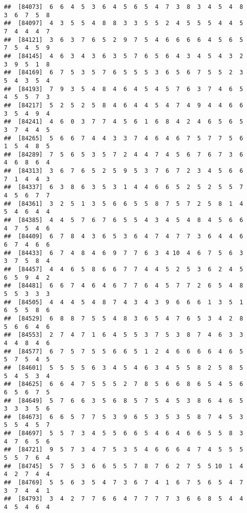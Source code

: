 \documentclass[
]{book}
\begin{document}
\begin{verbatim}
##  [84073]  6  6  4  5  3  6  4  5  6  5  4  7  3  8  3  4  5  4  8  3  6  7  5  8
##  [84097]  4  3  5  5  4  8  8  3  3  5  5  2  4  5  5  5  4  4  5  7  4  4  4  7
##  [84121]  3  6  3  7  6  5  2  9  7  5  4  6  6  6  6  4  5  6  5  7  5  4  5  9
##  [84145]  4  6  3  4  3  6  3  5  7  6  5  6  4  3  4  5  4  3  2  3  9  5  1  8
##  [84169]  6  7  5  3  5  7  6  5  5  5  3  6  5  6  7  5  5  2  3  5  4  3  5  4
##  [84193]  7  9  3  5  4  8  4  6  4  5  4  5  7  6  3  7  4  6  5  4  5  5  7  3
##  [84217]  5  2  5  2  5  8  4  6  4  4  5  4  7  4  9  4  4  6  6  3  5  4  9  4
##  [84241]  4  6  0  3  7  7  4  5  6  1  6  8  4  2  4  6  5  6  5  3  7  4  4  5
##  [84265]  5  6  6  7  4  4  3  3  7  4  6  4  6  7  5  7  7  5  6  1  5  4  8  5
##  [84289]  7  5  6  5  3  5  7  2  4  4  7  4  5  6  7  6  7  3  6  4  6  8  6  4
##  [84313]  3  6  7  6  5  2  5  9  5  3  7  6  7  2  3  4  5  6  6  7  1  4  4  3
##  [84337]  6  3  8  6  3  5  3  1  4  4  6  6  5  2  5  2  5  5  7  4  5  6  7  7
##  [84361]  3  2  5  1  3  5  6  6  5  5  8  7  5  7  2  5  8  1  4  5  4  6  4  4
##  [84385]  4  4  5  7  6  7  6  5  5  4  3  4  5  4  8  4  5  6  6  4  7  5  4  6
##  [84409]  6  7  8  4  3  6  5  3  6  4  7  4  7  7  3  6  4  4  6  6  7  4  6  6
##  [84433]  6  7  4  8  4  6  9  7  7  6  3  4 10  4  6  7  5  6  3  3  7  5  8  4
##  [84457]  4  4  6  5  8  6  6  7  7  4  4  5  2  5  3  6  2  4  5  6  5  9  4  2
##  [84481]  6  6  7  4  6  4  6  7  7  6  4  5  7  7  2  6  5  4  8  5  5  3  3  3
##  [84505]  4  4  4  5  4  8  7  4  3  4  3  9  6  6  6  1  3  5  1  6  5  5  8  6
##  [84529]  6  8  8  7  5  5  4  8  3  6  5  4  7  6  5  3  4  2  8  5  6  6  4  6
##  [84553]  2  7  4  7  1  6  4  5  5  3  7  5  3  8  7  4  6  3  3  4  4  8  4  6
##  [84577]  6  7  5  7  5  5  6  6  5  1  2  4  6  6  6  6  4  6  5  5  7  5  4  5
##  [84601]  5  5  5  5  6  3  4  5  4  6  3  4  5  5  8  2  5  8  5  5  4  5  3  4
##  [84625]  6  6  4  7  5  5  5  2  7  8  5  6  6  8  6  5  4  5  6  6  5  6  7  5
##  [84649]  5  7  6  6  3  5  6  8  5  7  5  4  5  3  8  6  4  6  5  3  3  3  5  6
##  [84673]  6  6  5  7  7  5  3  9  6  5  3  5  3  5  8  7  4  5  3  5  5  4  5  7
##  [84697]  5  5  7  3  4  5  5  6  6  5  4  6  4  6  6  5  5  8  3  4  7  6  5  6
##  [84721]  9  5  7  3  4  7  5  3  5  4  6  6  6  4  7  4  5  5  5  5  5  7  6  4
##  [84745]  5  7  5  3  6  6  5  5  7  8  7  6  2  7  5  5 10  1  4  4  2  7  4  4
##  [84769]  5  5  6  3  5  4  7  3  6  7  4  1  6  7  5  6  5  4  7  3  7  4  4  1
##  [84793]  3  4  2  7  7  6  6  4  7  7  7  7  3  6  6  8  5  4  4  4  5  4  6  4

\end{verbatim}
\end{document}
